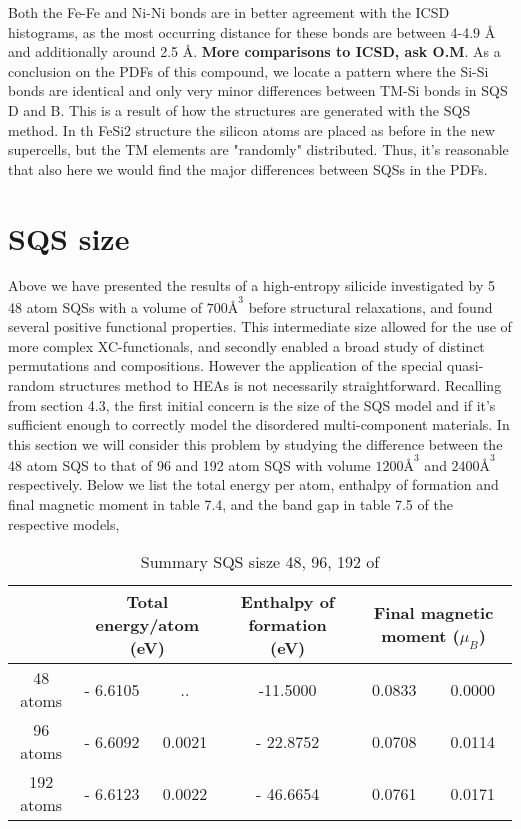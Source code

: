 Both the Fe-Fe and Ni-Ni bonds are in better agreement with the ICSD histograms, as the most occurring distance for these bonds are between 4-4.9 Å and additionally around 2.5 Å. \textbf{More comparisons to ICSD, ask O.M}. As a conclusion on the PDFs of this compound, we locate a pattern where the Si-Si bonds are identical and only very minor differences between TM-Si bonds in SQS D and B. This is a result of how the structures are generated with the SQS method. In th FeSi2 structure the silicon atoms are placed as before in the new supercells, but the TM elements are "randomly" distributed. Thus, it's reasonable that also here we would find the major differences between SQSs in the PDFs. 

\newpage
\section{SQS size}
Above we have presented the results of a high-entropy silicide  investigated by 5 48 atom SQSs with a volume of $700 Å^3$ before structural relaxations, and found several positive functional properties. This intermediate size allowed for the use of more complex XC-functionals, and secondly enabled a broad study of distinct permutations and compositions. However the application of the special quasi-random structures method to HEAs is not necessarily straightforward. Recalling from section 4.3, the first initial concern is the size of the SQS model and if it's sufficient enough to correctly model the disordered multi-component materials. In this section we will consider this problem by studying the difference between the 48 atom SQS to that of 96 and 192 atom SQS with volume $1200 Å^3$ and $2400 Å^3$ respectively. Below we list the total energy per atom, enthalpy of formation and final magnetic moment in table 7.4, and the band gap in table 7.5 of the respective models, 

\begin{table}[H]
\hskip-2cm\begin{tabular}{@{}cccccc@{}}
\toprule
       & \multicolumn{2}{c}{Total energy/atom (eV)} & Enthalpy of formation (eV) & \multicolumn{2}{c}{Final magnetic moment ($\mu_B$)} \\ \midrule
48 atoms & - 6.6105 & .. & -11.5000 & 0.0833 & 0.0000    \\
96 atoms & - 6.6092  & 0.0021 & - 22.8752  & 0.0708  & 0.0114     \\
192 atoms & - 6.6123  & 0.0022 & - 46.6654 & 0.0761 & 0.0171     \\ \bottomrule
\end{tabular}
\caption{Summary SQS sisze 48, 96, 192 of }
\end{table}

